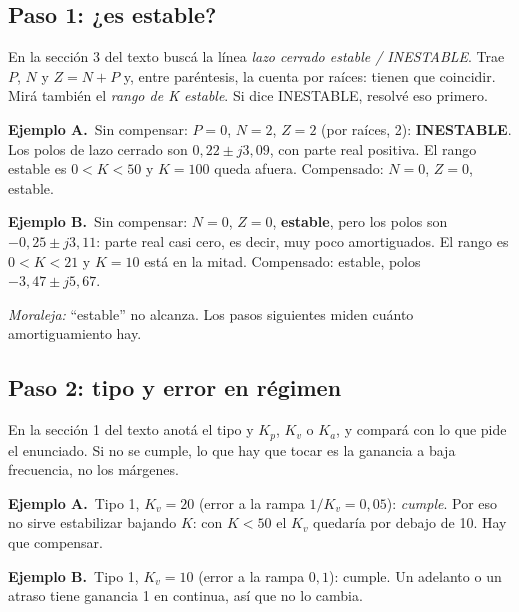 \documentclass[11pt,a4paper]{article}
\newcommand{\ejA}{\par\smallskip\noindent\textbf{\color{azul}Ejemplo A.}\ }
\newcommand{\ejB}{\par\smallskip\noindent\textbf{\color{rojo}Ejemplo B.}\ }
\begin{document}
\subsection{Paso 1: ¿es estable?}
\begin{leer}
En la sección 3 del texto buscá la línea \emph{lazo cerrado estable / INESTABLE}. Trae $P$, $N$ y $Z=N+P$ y, entre paréntesis,
la cuenta por raíces: tienen que coincidir. Mirá también el \emph{rango de K estable}. Si dice INESTABLE, resolvé eso primero.
\end{leer}
\ejA Sin compensar: $P=0$, $N=2$, $Z=2$ (por raíces, 2): \textbf{INESTABLE}. Los polos de lazo cerrado son $0{,}22\pm j3{,}09$, con parte real
positiva. El rango estable es $0<K<50$ y $K=100$ queda afuera. Compensado: $N=0$, $Z=0$, estable.

\ejB Sin compensar: $N=0$, $Z=0$, \textbf{estable}, pero los polos son $-0{,}25\pm j3{,}11$: parte real casi cero, es decir, muy poco
amortiguados. El rango es $0<K<21$ y $K=10$ está en la mitad. Compensado: estable, polos $-3{,}47\pm j5{,}67$.

\emph{Moraleja:} ``estable'' no alcanza. Los pasos siguientes miden cuánto amortiguamiento hay.

\subsection{Paso 2: tipo y error en régimen}
\begin{leer}
En la sección 1 del texto anotá el tipo y $K_p$, $K_v$ o $K_a$, y compará con lo que pide el enunciado. Si no se cumple, lo que hay
que tocar es la ganancia a baja frecuencia, no los márgenes.
\end{leer}
\ejA Tipo 1, $K_v=20$ (error a la rampa $1/K_v=0{,}05$): \emph{cumple}. Por eso no sirve estabilizar bajando $K$: con $K<50$ el
$K_v$ quedaría por debajo de 10. Hay que compensar.

\ejB Tipo 1, $K_v=10$ (error a la rampa $0{,}1$): cumple. Un adelanto o un atraso tiene ganancia 1 en continua, así que no lo cambia.
\end{document}
